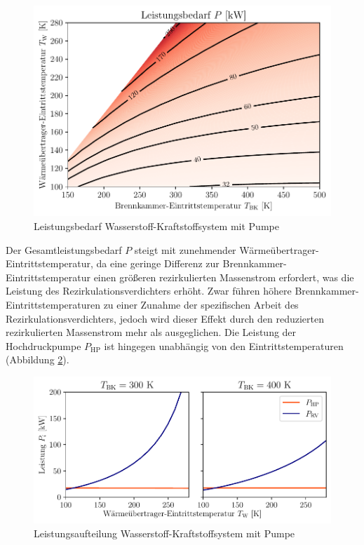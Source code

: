 \begin{figure}[ht]
\centering
\includegraphics[width=0.9\linewidth]{4_Abbildungen/2_Hauptteil/Ergebnisse/Pumpepowercontour.pdf}
  \caption{Leistungsbedarf Wasserstoff-Kraftstoffsystem mit Pumpe}
  \label{fig:pumppower}
\end{figure}
\FloatBarrier

Der Gesamtleistungsbedarf $P$ steigt mit zunehmender Wärmeübertrager-Eintrittstemperatur, da eine geringe Differenz zur Brennkammer-Eintrittstemperatur einen größeren rezirkulierten Massenstrom erfordert, was die Leistung des Rezirkulationsverdichters erhöht. Zwar führen höhere Brennkammer-Eintrittstemperaturen zu einer Zunahme der spezifischen Arbeit des Rezirkulationsverdichters, jedoch wird dieser Effekt durch den reduzierten rezirkulierten Massenstrom mehr als ausgeglichen. Die Leistung der Hochdruckpumpe $P_\mathrm{HP}$ ist hingegen unabhängig von den Eintrittstemperaturen (Abbildung \ref{fig:pumpsplit}). 

\begin{figure}[ht]
\centering
\includegraphics[width=0.9\linewidth]{4_Abbildungen/2_Hauptteil/Ergebnisse/Pumpe_powersplit.pdf}
  \caption{Leistungsaufteilung Wasserstoff-Kraftstoffsystem mit Pumpe}
  \label{fig:pumpsplit}
\end{figure}
\FloatBarrier

